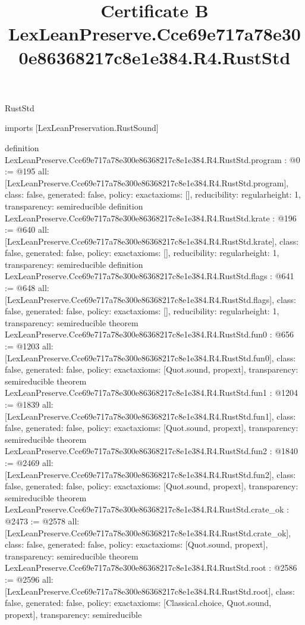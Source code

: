 \begin{lexlean}{RustStd}
\title{Certificate B LexLeanPreserve.Cce69e717a78e300e86368217c8e1e384.R4.RustStd}
\begin{coremodule}
imports [LexLeanPreservation.RustSound]

definition LexLeanPreserve.Cce69e717a78e300e86368217c8e1e384.R4.RustStd.program : @0 := @195 {
  all: [LexLeanPreserve.Cce69e717a78e300e86368217c8e1e384.R4.RustStd.program],
  class: false,
  generated: false,
  policy: exact{axioms: []},
  reducibility: regular{height: 1},
  transparency: semireducible
}
definition LexLeanPreserve.Cce69e717a78e300e86368217c8e1e384.R4.RustStd.krate : @196 := @640 {
  all: [LexLeanPreserve.Cce69e717a78e300e86368217c8e1e384.R4.RustStd.krate],
  class: false,
  generated: false,
  policy: exact{axioms: []},
  reducibility: regular{height: 1},
  transparency: semireducible
}
definition LexLeanPreserve.Cce69e717a78e300e86368217c8e1e384.R4.RustStd.flags : @641 := @648 {
  all: [LexLeanPreserve.Cce69e717a78e300e86368217c8e1e384.R4.RustStd.flags],
  class: false,
  generated: false,
  policy: exact{axioms: []},
  reducibility: regular{height: 1},
  transparency: semireducible
}
theorem LexLeanPreserve.Cce69e717a78e300e86368217c8e1e384.R4.RustStd.fun0 : @656 := @1203 {
  all: [LexLeanPreserve.Cce69e717a78e300e86368217c8e1e384.R4.RustStd.fun0],
  class: false,
  generated: false,
  policy: exact{axioms: [Quot.sound, propext]},
  transparency: semireducible
}
theorem LexLeanPreserve.Cce69e717a78e300e86368217c8e1e384.R4.RustStd.fun1 : @1204 := @1839 {
  all: [LexLeanPreserve.Cce69e717a78e300e86368217c8e1e384.R4.RustStd.fun1],
  class: false,
  generated: false,
  policy: exact{axioms: [Quot.sound, propext]},
  transparency: semireducible
}
theorem LexLeanPreserve.Cce69e717a78e300e86368217c8e1e384.R4.RustStd.fun2 : @1840 := @2469 {
  all: [LexLeanPreserve.Cce69e717a78e300e86368217c8e1e384.R4.RustStd.fun2],
  class: false,
  generated: false,
  policy: exact{axioms: [Quot.sound, propext]},
  transparency: semireducible
}
theorem LexLeanPreserve.Cce69e717a78e300e86368217c8e1e384.R4.RustStd.crate_ok : @2473 := @2578 {
  all: [LexLeanPreserve.Cce69e717a78e300e86368217c8e1e384.R4.RustStd.crate_ok],
  class: false,
  generated: false,
  policy: exact{axioms: [Quot.sound, propext]},
  transparency: semireducible
}
theorem LexLeanPreserve.Cce69e717a78e300e86368217c8e1e384.R4.RustStd.root : @2586 := @2596 {
  all: [LexLeanPreserve.Cce69e717a78e300e86368217c8e1e384.R4.RustStd.root],
  class: false,
  generated: false,
  policy: exact{axioms: [Classical.choice, Quot.sound, propext]},
  transparency: semireducible
}


\end{coremodule}
\end{lexlean}
